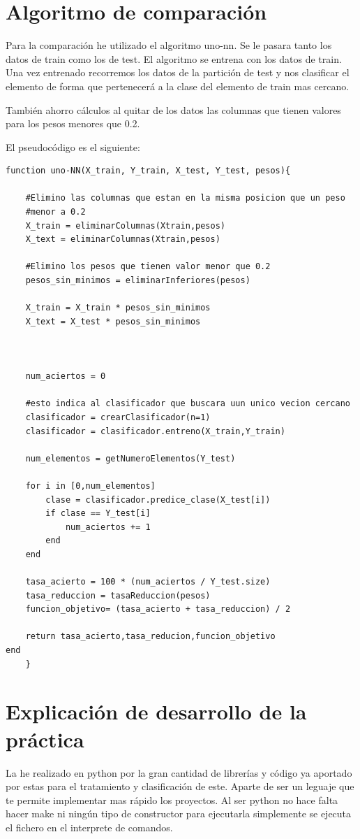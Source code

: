 \documentclass[titlepage]{article}
\begin{document}
	\section{Algoritmo de comparación}

	
	Para la comparación he utilizado el algoritmo uno-nn. Se le pasara tanto los datos de train como los de test. El algoritmo se entrena con los datos de train. Una vez entrenado recorremos los datos de la partición de test y nos clasificar el elemento de forma que pertenecerá a la clase del elemento de train mas cercano.
	
	
	También ahorro cálculos al quitar de los datos las columnas que tienen valores para los pesos menores que 0.2. 
	
	El pseudocódigo es el siguiente:

	
	\begin{lstlisting}
function uno-NN(X_train, Y_train, X_test, Y_test, pesos){
	
	#Elimino las columnas que estan en la misma posicion que un peso 
	#menor a 0.2
	X_train = eliminarColumnas(Xtrain,pesos)
	X_text = eliminarColumnas(Xtrain,pesos)
	
	#Elimino los pesos que tienen valor menor que 0.2
	pesos_sin_minimos = eliminarInferiores(pesos)
	
	X_train = X_train * pesos_sin_minimos
	X_text = X_test * pesos_sin_minimos
	
	
	
	num_aciertos = 0
	
	#esto indica al clasificador que buscara uun unico vecion cercano
	clasificador = crearClasificador(n=1)
	clasificador = clasificador.entreno(X_train,Y_train)
	
	num_elementos = getNumeroElementos(Y_test)
	
	for i in [0,num_elementos]
		clase = clasificador.predice_clase(X_test[i])
		if clase == Y_test[i]
			num_aciertos += 1
		end
	end
	
	tasa_acierto = 100 * (num_aciertos / Y_test.size)
	tasa_reduccion = tasaReduccion(pesos)
	funcion_objetivo= (tasa_acierto + tasa_reduccion) / 2
	
	return tasa_acierto,tasa_reducion,funcion_objetivo
end
	}
	\end{lstlisting}
	
	
	
	
	
	\section{Explicación de desarrollo de la práctica}
	La he realizado en python por la gran cantidad de librerías y código ya aportado por estas para el tratamiento y clasificación de este.
	Aparte de ser un leguaje que te permite implementar mas rápido los proyectos.
	Al ser python no hace falta hacer make ni ningún tipo de constructor para ejecutarla simplemente se ejecuta el fichero en el interprete de comandos.
	
\end{document}
